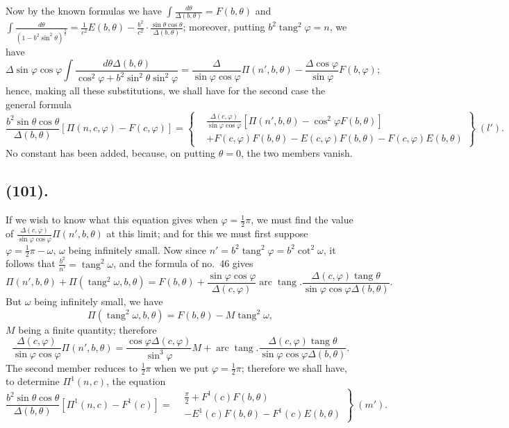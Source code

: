 \documentclass{article}
\begin{document}
Now by the known formulas we have $\displaystyle\int\frac{d\theta}{\Delta(b,\theta)}=F(b,\theta)$ and $\displaystyle\int\frac{d\theta}{(1-b^{2}\sin^{2}\theta)^{\frac{3}{2}}}=\frac{1}{c^{2}}E(b,\theta)-\frac{b^{2}}{c^{2}}\cdot\frac{\sin\theta\cos\theta}{\Delta(b,\theta)}$; moreover, putting $b^{2}\operatorname{tang}^{2}\varphi=n$, we have
\[ \Delta\sin\varphi\cos\varphi\int\frac{d\theta\Delta(b,\theta)}{\cos^{2}\varphi+b^{2}\sin^{2}\theta\sin^{2}\varphi}=\frac{\Delta}{\sin\varphi\cos\varphi}\Pi(n',b,\theta)-\frac{\Delta\cos\varphi}{\sin\varphi}F(b,\varphi); \]
hence, making all these substitutions, we shall have for the second case the general formula
\[ \frac{b^{2}\sin\theta\cos\theta}{\Delta(b,\theta)}[\Pi(n,c,\varphi)-F(c,\varphi)]=\left\{\begin{aligned} &\frac{\Delta(c,\varphi)}{\sin\varphi\cos\varphi}[\Pi(n',b,\theta)-\cos^{2}\varphi F(b,\theta)]\\ &+F(c,\varphi)F(b,\theta)-E(c,\varphi)F(b,\theta)-F(c,\varphi)E(b,\theta) \end{aligned}\right\}\;(l'). \]
No constant has been added, because, on putting $\theta=0$, the two members vanish.

\subsection*{(101).}

If we wish to know what this equation gives when $\varphi=\tfrac{1}{2}\pi$, we must find the value of $\frac{\Delta(c,\varphi)}{\sin\varphi\cos\varphi}\Pi(n',b,\theta)$ at this limit; and for this we must first suppose $\varphi=\tfrac{1}{2}\pi-\omega$, $\omega$ being infinitely small. Now since $n'=b^{2}\operatorname{tang}^{2}\varphi=b^{2}\cot^{2}\omega$, it follows that $\frac{b^{2}}{n'}=\operatorname{tang}^{2}\omega$, and the formula of no.\ 46 gives
\[ \Pi(n',b,\theta)+\Pi(\operatorname{tang}^{2}\omega,b,\theta)=F(b,\theta)+\frac{\sin\varphi\cos\varphi}{\Delta(c,\varphi)}\operatorname{arc}\operatorname{tang}.\frac{\Delta(c,\varphi)\operatorname{tang}\theta}{\sin\varphi\cos\varphi\Delta(b,\theta)}. \]
But $\omega$ being infinitely small, we have
\[ \Pi(\operatorname{tang}^{2}\omega,b,\theta)=F(b,\theta)-M\operatorname{tang}^{2}\omega, \]
$M$ being a finite quantity; therefore
\[ \frac{\Delta(c,\varphi)}{\sin\varphi\cos\varphi}\Pi(n',b,\theta)=\frac{\cos\varphi\Delta(c,\varphi)}{\sin^{3}\varphi}M+\operatorname{arc}\operatorname{tang}.\frac{\Delta(c,\varphi)\operatorname{tang}\theta}{\sin\varphi\cos\varphi\Delta(b,\theta)}. \]
The second member reduces to $\tfrac{1}{2}\pi$ when we put $\varphi=\tfrac{1}{2}\pi$; therefore we shall have, to determine $\Pi^{1}(n,c)$, the equation
\[ \frac{b^{2}\sin\theta\cos\theta}{\Delta(b,\theta)}[\Pi^{1}(n,c)-F^{1}(c)]=\left.\begin{aligned} &\frac{\pi}{2}+F^{1}(c)F(b,\theta)\\ &-E^{1}(c)F(b,\theta)-F^{1}(c)E(b,\theta) \end{aligned}\right\}\;(m'). \]
\end{document}
